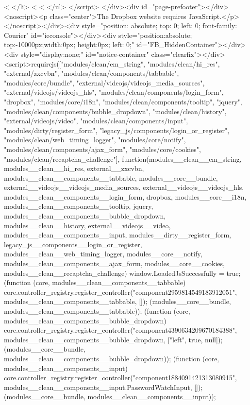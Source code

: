 {          <%
        </li>
      <%
  <%
    </ul>
</script>
</div><div id="page-prefooter"></div><noscript><p class="center">The Dropbox website requires JavaScript.</p></noscript></div><div style="position: absolute; top: 0; left: 0; font-family: Courier" id="ieconsole"></div><div style="position:absolute; top:-10000px;width:0px; height:0px; left: 0;" id="FB_HiddenContainer"></div><div style="display:none;" id="notice-container" class="clearfix"></div><script>requirejs(["modules/clean/em_string", "modules/clean/hi_res", "external/zxcvbn", "modules/clean/components/tabbable", "modules/core/bundle", "external/videojs/videojs_media_sources", "external/videojs/videojs_hls", "modules/clean/components/login_form", "dropbox", "modules/core/i18n", "modules/clean/components/tooltip", "jquery", "modules/clean/components/bubble_dropdown", "modules/clean/history", "external/videojs/video", "modules/clean/components/input", "modules/dirty/register_form", "legacy_js/components/login_or_register", "modules/clean/web_timing_logger", "modules/core/notify", "modules/clean/components/ajax_form", "modules/core/cookies", "modules/clean/recaptcha_challenge"], function(modules__clean__em_string, modules__clean__hi_res, external__zxcvbn, modules__clean__components__tabbable, modules__core__bundle, external__videojs__videojs_media_sources, external__videojs__videojs_hls, modules__clean__components__login_form, dropbox, modules__core__i18n, modules__clean__components__tooltip, jquery, modules__clean__components__bubble_dropdown, modules__clean__history, external__videojs__video, modules__clean__components__input, modules__dirty__register_form, legacy_js__components__login_or_register, modules__clean__web_timing_logger, modules__core__notify, modules__clean__components__ajax_form, modules__core__cookies, modules__clean__recaptcha_challenge) { window.LoadedJsSuccessfully = true;
(function (core, modules__clean__components__tabbable) { core.controller_registry.register_controller("component2959814549183912051", modules__clean__components__tabbable, []); }(modules__core__bundle, modules__clean__components__tabbable));
(function (core, modules__clean__components__bubble_dropdown) { core.controller_registry.register_controller("component4390634209670184388", modules__clean__components__bubble_dropdown, ["left", true, null]); }(modules__core__bundle, modules__clean__components__bubble_dropdown));
(function (core, modules__clean__components__input) { core.controller_registry.register_controller("component1884091421313080915", modules__clean__components__input.PasswordWatchInput, []); }(modules__core__bundle, modules__clean__components__input));
}}
